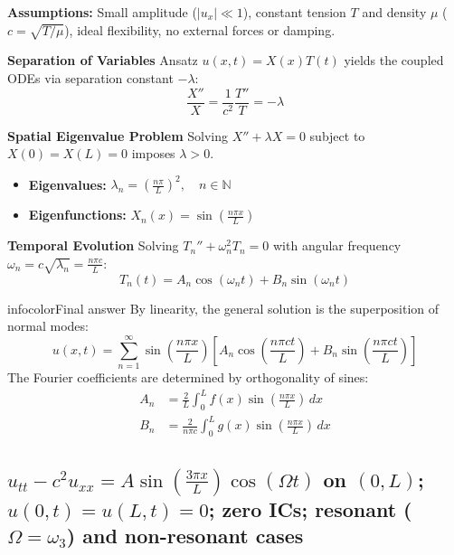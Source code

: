\documentclass[a4paper,11pt]{article} %
\newenvironment{summarybox}[1][]{\begin{custombox}[#1]{infocolor}{Final answer}}{\end{custombox}}
\begin{document}
\textbf{Assumptions:} Small amplitude ($|u_x| \ll 1$), constant tension $T$ and density $\mu$ ($c = \sqrt{T/\mu}$), ideal flexibility, no external forces or damping.

\textbf{Separation of Variables}
Ansatz $u(x,t) = X(x)T(t)$ yields the coupled ODEs via separation constant $-\lambda$:
\begin{equation}
    \frac{X''}{X} = \frac{1}{c^2}\frac{T''}{T} = -\lambda
\end{equation}

\textbf{Spatial Eigenvalue Problem}
Solving $X'' + \lambda X = 0$ subject to $X(0)=X(L)=0$ imposes $\lambda > 0$.
\begin{itemize}
    \item \textbf{Eigenvalues:} $\lambda_n = \left(\frac{n\pi}{L}\right)^2, \quad n \in \mathbb{N}$
    \item \textbf{Eigenfunctions:} $X_n(x) = \sin\left(\frac{n\pi x}{L}\right)$
\end{itemize}

\textbf{Temporal Evolution}
Solving $T_n'' + \omega_n^2 T_n = 0$ with angular frequency $\omega_n = c\sqrt{\lambda_n} = \frac{n\pi c}{L}$:
\begin{equation}
    T_n(t) = A_n \cos(\omega_n t) + B_n \sin(\omega_n t)
\end{equation}

\begin{summarybox}[title={General Solution}]
By linearity, the general solution is the superposition of normal modes:
$$ u(x,t) = \sum_{n=1}^{\infty} \sin\left(\frac{n\pi x}{L}\right) \left[ A_n \cos\left(\frac{n\pi c t}{L}\right) + B_n \sin\left(\frac{n\pi c t}{L}\right) \right] $$
The Fourier coefficients are determined by orthogonality of sines:
\begin{align*}
    A_n &= \frac{2}{L} \int_0^L f(x) \sin\left(\frac{n\pi x}{L}\right) \, dx \\
    B_n &= \frac{2}{n\pi c} \int_0^L g(x) \sin\left(\frac{n\pi x}{L}\right) \, dx
\end{align*}
\end{summarybox}


\newpage
\subsection{\texorpdfstring{$u_{tt} - c^2 u_{xx} = A\sin\!\left(\frac{3\pi x}{L}\right)\cos(\Omega t)$ on $(0,L)$; $u(0,t)=u(L,t)=0$; zero ICs; resonant ($\Omega=\omega_3$) and non-resonant cases}{Forced wave equation: bounded beats when non-resonant; secular growth when resonant}}
\end{document}
